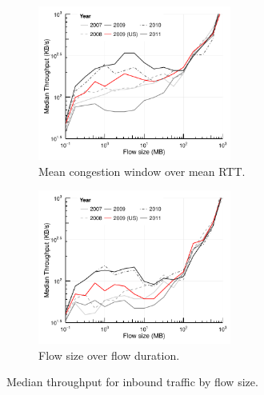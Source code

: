 \begin{figure}
    \begin{subfigure}[b]{.5\linewidth}
        \centering
        \includegraphics[width=2.5in]{figures/malawi/med_active_throughput}
        \caption{Mean congestion window over mean RTT. \label{fig:flowrateactive}}
    \end{subfigure}%
    \begin{subfigure}[b]{.5\linewidth}
        \centering
        \includegraphics[width=2.5in]{figures/malawi/med_aggr_throughput}
        \caption{Flow size over flow duration.\label{fig:flowrateaggr}}
    \end{subfigure}%
    \caption{Median throughput for inbound traffic by flow size. \label{fig:flowrate}}
\end{figure}
 
